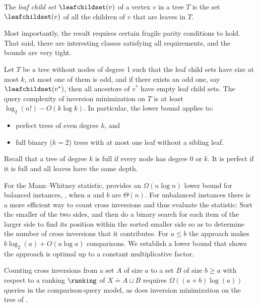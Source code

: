 \documentclass{toc}
\begin{document}
\begin{definition}\label{def:leaf-child-set} The \emph{leaf child set} $\leafchildset(v)$ of a vertex $v$ in a tree $T$ is the set $\leafchildset(v)$ of all the children of $v$ that are leaves in $T$.
\end{definition}
Most importantly, the result requires certain fragile parity conditions to hold. That said, there are interesting classes satisfying all requirements, and the bounds are very tight. 
\begin{theorem}\label{thm:main:special}
Let $T$ be a tree without nodes of degree 1 such that the leaf child sets have size at most $k$, at most one of them is odd, and if there exists an odd one, say $\leafchildset(v^*)$, then all ancestors of $v^*$ have empty leaf child sets. The query complexity of inversion minimization on $T$ is at least $\log_2(n!) - O(k \log k)$. In particular, the lower bound applies to:
\begin{itemize}
\item perfect trees of even degree $k$, and
\item full binary ($k=2$) trees with at most one leaf without a sibling leaf.
\end{itemize}
\end{theorem}
Recall that a tree of degree $k$ is full if every node has degree 0 or $k$. It is perfect if it is full and all leaves have the same depth.

For the Mann--Whitney statistic,  provides an $\Omega(n \log n)$ lower bound for balanced instances, \ie, when $a$ and $b$ are $\Theta(n)$. For unbalanced instances there is a more efficient way to count cross inversions and thus evaluate the statistic: Sort the smaller of the two sides, and then do a binary search for each item of the larger side to find its position within the sorted smaller side so as to determine the number of cross inversions that it contributes. For $a \le b$ the approach makes $b \log_2(a) + O(a \log a)$ comparisons. We establish a lower bound that shows the approach is optimal up to a constant multiplicative factor.
\begin{theorem}\label{thm:Mann-Whitney}
Counting cross inversions from a set $A$ of size $a$ to a set $B$ of size $b \ge a$ with respect to a ranking $\ranking$ of $X \doteq A \sqcup B$ requires $\Omega((a+b)\log(a))$ queries in the comparison-query model, as does inversion minimization on the tree of .
\end{theorem}
\end{document}
